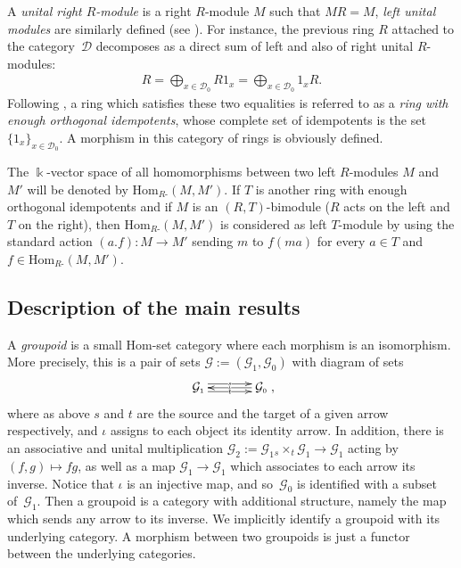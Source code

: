 \documentclass[11pt]{article}
\numberwithin{equation}{section}
\renewcommand{\hom}[3]{\mathrm{Hom}_{\Sscript{#1}}\left(#2, #3\right)}
\newcommand{\Go}{\cG_{\Sscript{0}}}
\newcommand{\Ga}{\cG_{\Sscript{1}}}
\newcommand{\Do}{\cD_{\Sscript{0}}}
\newcommand{\cD}{{\mathcal D}}
\newcommand{\cG}{{\mathcal G}}
\newcommand{\Sscript}[1]{\scriptscriptstyle{#1}}
\newcommand{\due}[3]{{}_{{#2 }} {#1}_{{ #3}} }
\begin{document}
A \emph{unital right $R$-module} is a right $R$-module $M$ such that $MR=M$, \emph{left unital modules} are similarly defined (see \cite[p.~347]{Gabriel:1962}). For instance, the previous ring $R$ attached to the category~$\cD$ decomposes as a direct sum of left and also of right unital $R$-modules:
\begin{gather*}
R = \bigoplus_{x \in \Do} R 1_{\Sscript{x}} = \bigoplus_{x \in \Do} 1_{\Sscript{x}} R.
\end{gather*}
Following \cite{Fuller:1976}, a ring which satisfies these two equalities is referred to as a \emph{ring with enough orthogonal idempotents}, whose complete set of idempotents is the set $\{1_{\Sscript{x}}\}_{x \in \Do}$. A morphism in this category of rings is obviously defined.

The $\Bbbk$-vector space of all homomorphisms between two left $R$-modules $M$ and $M'$ will be denoted by $\hom{R\text{-}}{M}{M'}$. If $T$ is another ring with enough orthogonal idempotents and if $M$ is an $(R, T)$-bimodule ($R$ acts on the left and $T$ on the right), then $\hom{R\text{-}}{M}{M'}$ is considered as left $T$-module by using the standard action $(a .f) \colon M \to M'$ sending $m$ to $f(m a)$ for every $a \in T$ and $f \in \hom{R\text{-}}{M}{M'}$.

\subsection{Description of the main results}\label{ssec:raroes}
A \emph{groupoid} is a small Hom-set category where each morphism is an isomorphism. More precisely, this is a pair of sets
$\cG:=(\cG_{\Sscript{1}}, \cG_{\Sscript{0}})$ with diagram of sets
\begin{gather*}
\xymatrix@C=35pt{
\cG_{\Sscript{1}}\ar@<0.70ex>@{->}|-{\scriptscriptstyle{{s}}}[r]
\ar@<-0.70ex>@{->}|-{\scriptscriptstyle{{t}}}[r] & \ar@{->}|-{
\scriptscriptstyle{\iota}}[l] \cG_{\Sscript{0}}},
\end{gather*}
where as above $s$ and $t$ are the source and the target of a given arrow respectively, and $\iota$ assigns to each object its identity arrow. In addition, there is an associative and unital multiplication $\cG_{\Sscript{2}}:= \cG_{\Sscript{1}} \due \times {\Sscript{{s}}} { \Sscript{{t}}} \cG_{\Sscript{1}} \to \cG_{\Sscript{1}}$ acting by $(f,g) \mapsto fg$, as well as a map $\cG_{\Sscript{1}} \to \cG_{\Sscript{1}}$ which associates to each arrow its inverse. Notice that $\iota$ is an injective map, and so~$\Go$ is identified with a subset of~$\Ga$. Then a groupoid is a category with additional structure, namely the map which sends any arrow to its inverse. We implicitly identify a groupoid with its underlying category. A morphism between two groupoids is just a functor between the underlying categories.
\end{document}
